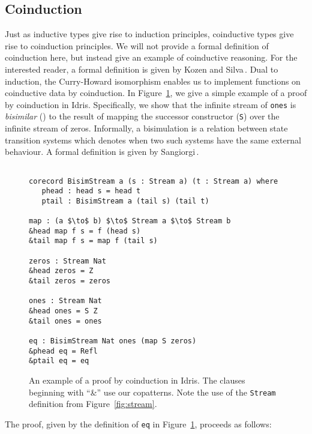 \subsection{Coinduction}
Just as inductive types give rise to induction principles, coinductive types
give rise to coinduction principles. We will not provide a formal definition of
coinduction here, but instead give an example of coinductive reasoning. For the
interested reader, a formal definition is given by Kozen and
Silva\,\citep{Kozen2012}. Dual to induction, the Curry-Howard isomorphism
enables us to implement functions on coinductive data by coinduction. In
Figure~\ref{fig:proof_by_coinduction}, we give a simple example of a proof by
coinduction in Idris. Specifically, we show that the infinite stream of
\texttt{ones} is \emph{bisimilar} (\bisim) to the result of mapping the successor
constructor (\texttt{S}) over the infinite stream of zeros. Informally, a bisimulation is a relation between state transition
systems which denotes when two such systems have the same external behaviour. A
formal definition is given by Sangiorgi\,\citep[Section~1.4]{Sangiorgi2011}.
\begin{figure}[h]
\begin{lstlisting}[mathescape]
%default total
     
corecord BisimStream a (s : Stream a) (t : Stream a) where
   phead : head s = head t
   ptail : BisimStream a (tail s) (tail t)

map : (a $\to$ b) $\to$ Stream a $\to$ Stream b
&head map f s = f (head s)
&tail map f s = map f (tail s)

zeros : Stream Nat
&head zeros = Z
&tail zeros = zeros

ones : Stream Nat
&head ones = S Z
&tail ones = ones

eq : BisimStream Nat ones (map S zeros)
&phead eq = Refl
&ptail eq = eq
\end{lstlisting}
  \caption{An example of a proof by coinduction in Idris. The clauses beginning
    with ``\&'' use our copatterns. Note the use of the \texttt{Stream}
    definition from Figure~\ref{fig:stream}.}
\label{fig:proof_by_coinduction}
\end{figure}
The proof, given by the definition of \texttt{eq} in
Figure~\ref{fig:proof_by_coinduction}, proceeds as follows: 
